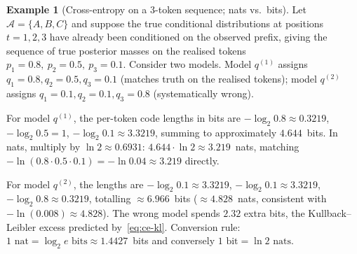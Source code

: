\documentclass[12pt,a4paper]{article}
\theoremstyle{plain}
\theoremstyle{definition}
\newtheorem{example}[theorem]{Example}
\begin{document}
\begin{example}[Cross-entropy on a 3-token sequence; nats vs.\ bits]
\label{ex:ce3}
Let $\mathcal{A} = \{A,B,C\}$ and suppose the true conditional
distributions at positions $t=1,2,3$ have already been conditioned on
the observed prefix, giving the sequence of true posterior masses on
the realised tokens $p_1 = 0.8,\ p_2 = 0.5,\ p_3 = 0.1$.  Consider
two models.  Model $q^{(1)}$ assigns $q_1 = 0.8, q_2 = 0.5,
q_3 = 0.1$ (matches truth on the realised tokens); model $q^{(2)}$
assigns $q_1 = 0.1, q_2 = 0.1, q_3 = 0.8$ (systematically wrong).

For model $q^{(1)}$, the per-token code lengths in bits are
$-\log_2 0.8 \approx 0.3219$, $-\log_2 0.5 = 1$,
$-\log_2 0.1 \approx 3.3219$, summing to approximately $4.644$~bits.
In nats, multiply by $\ln 2 \approx 0.6931$: $4.644 \cdot \ln 2
\approx 3.219$~nats, matching $-\ln(0.8 \cdot 0.5 \cdot 0.1) =
-\ln 0.04 \approx 3.219$ directly.

For model $q^{(2)}$, the lengths are $-\log_2 0.1 \approx 3.3219$,
$-\log_2 0.1 \approx 3.3219$, $-\log_2 0.8 \approx 0.3219$, totalling
$\approx 6.966$~bits ($\approx 4.828$~nats, consistent with
$-\ln(0.008) \approx 4.828$).  The wrong model spends $2.32$ extra
bits, the Kullback--Leibler excess predicted by~\eqref{eq:ce-kl}.
Conversion rule: $1\text{ nat} = \log_2 e \text{ bits} \approx
1.4427$~bits and conversely $1\text{ bit} = \ln 2 \text{ nats}$.
\end{example}



\end{document}
